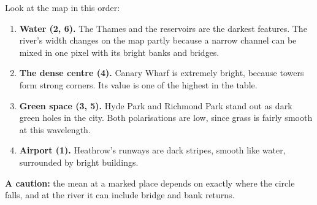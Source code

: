 \begin{table}[H]\centering\small\caption{Measured values, averaged over a small circle at each numbered place in Figure~\ref{fig:london}.}\label{tab:places}\end{table}

Look at the map in this order:
\begin{enumerate}
\item \textbf{Water (2, 6).} The Thames and the reservoirs are the darkest features. The river's width changes on the map partly because a narrow channel can be mixed in one pixel with its bright banks and bridges.
\item \textbf{The dense centre (4).} Canary Wharf is extremely bright, because towers form strong corners. Its value is one of the highest in the table.
\item \textbf{Green space (3, 5).} Hyde Park and Richmond Park stand out as dark green holes in the city. Both polarisations are low, since grass is fairly smooth at this wavelength.
\item \textbf{Airport (1).} Heathrow's runways are dark stripes, smooth like water, surrounded by bright buildings.
\end{enumerate}
\textbf{A caution:} the mean at a marked place depends on exactly where the circle falls, and at the river it can include bridge and bank returns.
